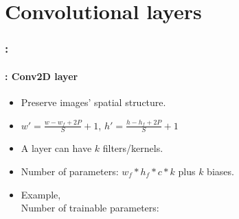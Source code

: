 \documentclass[xcolor=table]{beamer}
\begin{document}
\section{Convolutional layers}

\begin{frame}
	\frametitle{\insertshortsubtitle}
	\framesubtitle{\insertsection}
	
\end{frame}

\begin{frame}
	\frametitle{\insertshortsubtitle: \insertsection}
	\framesubtitle{\insertsubsection: Conv2D layer}

	\begin{minipage}{0.60\textwidth} 
		\begin{itemize}
			\item Preserve images' spatial structure.
			\item $ w' = \frac{w - w_f + 2P}{S} + 1$, $ h' = \frac{h - h_f + 2P}{S} + 1$
			\item A layer can have $k$ filters/kernels.
			\item Number of parameters: $w_f * h_f * c * k$ plus $k$ biases.
			\item Example,   \\ Number of trainable parameters: 
		\end{itemize}
	\end{minipage}
	\begin{minipage}{0.39\textwidth}
		
	\end{minipage}

\end{frame}
\end{document}
